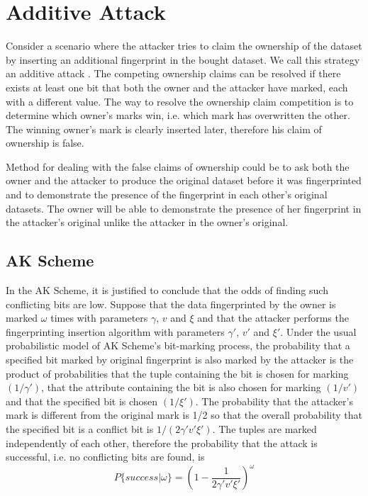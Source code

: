 \section{Additive Attack}
Consider a scenario where the attacker tries to claim the ownership of the dataset by inserting an additional fingerprint in the bought dataset. We call this strategy an additive attack \cite{agrawal2003watermarking}. The competing ownership claims can be resolved if there exists at least one bit that both the owner and the attacker have marked, each with a different value. The way to resolve the ownership claim competition is to determine which owner's marks win, i.e. which mark has overwritten the other. The winning owner's mark is clearly inserted later, therefore his claim of ownership is false.

Method for dealing with the false claims of ownership could be to ask both the owner and the attacker to produce the original dataset before it was fingerprinted and to demonstrate the presence of the fingerprint in each other's original datasets. 
The owner will be able to demonstrate the presence of her fingerprint in the attacker's original unlike the attacker in the owner's original. 


\subsection{AK Scheme}\label{subsubsec:additive-ak}
In the AK Scheme, it is justified to conclude that the odds of finding such conflicting bits are low. 
Suppose that the data fingerprinted by the owner is marked $\omega$ times with parameters $\gamma$, $v$ and $\xi$ and that the attacker performs the fingerprinting insertion algorithm with parameters $\gamma'$, $v'$ and $\xi'$. Under the usual probabilistic model of AK Scheme's bit-marking process, the probability that a specified bit marked by original fingerprint is also marked by the attacker is the product of probabilities that the tuple containing the bit is chosen for marking $(1/\gamma')$, that the attribute containing the bit is also chosen for marking $(1/v')$ and that the specified bit is chosen $(1/\xi')$. The probability that the attacker's mark is different from the original mark is 1/2 so that the overall probability that the specified bit is a conflict bit is $1/(2\gamma'v'\xi')$. The tuples are marked independently of each other, therefore the probability that the attack is successful, i.e. no conflicting bits are found, is
\begin{equation}
    P\{success|\omega\}=(1-\frac{1}{2\gamma'v'\xi'})^\omega
\end{equation}

